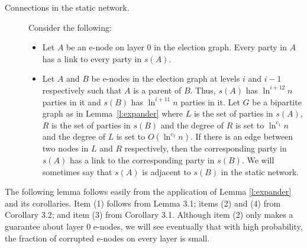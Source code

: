 \documentclass[11pt,letter]{article}
\theoremstyle{mytheoremstyle}
\begin{document}
\begin{description}
	\item[Connections in the static network.] Consider the following:
	\begin{itemize}	
		\item Let $A$ be an \textsf{e-node} on layer $0$ in the election graph.
		Every party in $A$ has a link to every party in $s(A)$.
		
		\item Let $A$ and $B$ be \textsf{e-node}s in the election graph at levels $i$ and $i-1$ respectively such that $A$ is a parent of $B$. Thus, $s(A)$ has $\ln^{i+12} n$ parties in it and $s(B)$ has $\ln^{i+11} n$ parties in it. Let $G$ be a bipartite graph as in Lemma~\ref{l:expander} where $L$ is the set of parties in $s(A)$, $R$ is the set of parties in $s(B)$ and the degree of $R$ is set to $\ln^{c_1} n$ and the degree of $L$ is set to $O(\ln^{c_2}n)$.  If there is an edge between two nodes in $L$ and $R$ respectively, then the corresponding party in $s(A)$ has a link to the corresponding party in $s(B)$. We will sometimes say that $s(A)$ is adjacent to $s(B)$ in the static network.
	\end{itemize}
\end{description}

The following lemma follows easily from the application of Lemma \ref{l:expander} and its corollaries.
Item (1) follows from Lemma 3.1; items (2) and (4)  from Corollary 3.2; and item (3) from Corollary 3.1. Although item (2) only makes a guarantee about layer 0 \textsf{e-node}s, we will see eventually that with high probability, the fraction of corrupted \textsf{e-node}s on every layer is small.
\end{document}
